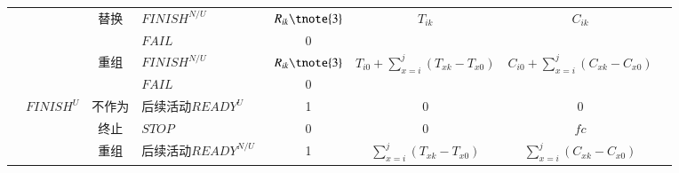 \begin{table}[htbp]
\begin{threeparttable}
\begin{tabular}{llllllll}
            \multicolumn{1}{c}{} 
            &       
            & \multicolumn{1}{c}{替换} 
            & \multicolumn{1}{l}{$FINISH^{N/U}$} 
            & \multicolumn{1}{c}{$R_{ik}\tnote{3}$} 
            & \multicolumn{1}{c}{\multirow{2}{*}{${T_{ik}}$}} 
            & \multicolumn{1}{c}{\multirow{2}{*}{${C_{ik}}$}} \\
            
            \multicolumn{1}{c}{} 
            &       
            & \multicolumn{1}{c}{} 
            & \multicolumn{1}{l}{$FAIL$} 
            & \multicolumn{1}{c}{0} 
            & \multicolumn{1}{c}{} 
            & \multicolumn{1}{c}{} \\
            
            \multicolumn{1}{c}{} 
            &       
            & \multicolumn{1}{c}{重组} 
            & \multicolumn{1}{l}{$FINISH^{N/U}$} 
            & \multicolumn{1}{c}{$R_{ik}\tnote{3}$} 
            & \multicolumn{1}{c}{\multirow{2}{*}{${T_{i0}} + \sum\limits_{x = i}^j {({T_{xk}} - {T_{x0}})} $}}
            & \multicolumn{1}{c}{\multirow{2}{*}{${C_{i0}} + \sum\limits_{x = i}^j {({C_{xk}} - {C_{x0}})} $}} \\

            \multicolumn{1}{c}{} 
            &       
            & \multicolumn{1}{c}{} 
            & \multicolumn{1}{l}{$FAIL$} 
            & \multicolumn{1}{c}{0} 
            & \multicolumn{1}{c}{} 
            & \multicolumn{1}{c}{} \\
            
            \multicolumn{1}{c}{} 
            & {$FINISH^U$} 
            & \multicolumn{1}{c}{不作为} 
            & \multicolumn{1}{l}{后续活动$READY^U$~\tnote{4}} 
            & \multicolumn{1}{c}{1} 
            & \multicolumn{1}{c}{0} 
            & \multicolumn{1}{c}{0} \\
            
            \multicolumn{1}{c}{} 
            &       
            & \multicolumn{1}{c}{终止} 
            & \multicolumn{1}{l}{$STOP$} 
            & \multicolumn{1}{c}{0} 
            & \multicolumn{1}{c}{0} 
            & \multicolumn{1}{c}{$fc$} \\
            
            \multicolumn{1}{c}{} 
            &       
            & \multicolumn{1}{c}{重组} 
            & \multicolumn{1}{l}{后续活动$READY^{N/U}$~\tnote{4}} 
            & \multicolumn{1}{c}{1} 
            & \multicolumn{1}{c}{$\sum\limits_{x = i}^j {({T_{xk}} - {T_{x0}})} $} 
            & \multicolumn{1}{c}{$\sum\limits_{x = i}^j {({C_{xk}} - {C_{x0}})} $}  \\
            

\end{tabular}
\end{threeparttable}
\end{table}

